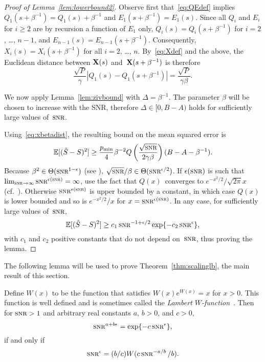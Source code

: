 \begin{proof}[Proof of Lemma~\ref{lem:lowerbound2}]
  Observe first that~\eqref{eq:QEdef} implies $Q_1(s + \beta^{-1}) = Q_1(s) +
  \beta^{-1}$ and $E_1(s + \beta^{-1}) = E_1(s)$. Since all $Q_i$ and $E_i$ for
  $i \ge 2$ are by recursion a function of $E_1$ only, $Q_i(s) = Q_i(s +
  \beta^{-1})$ for $i = 2$, \dots, $n-1$, and $E_{n-1}(s) = E_{n-1}(s +
  \beta^{-1})$. Consequently,  $X_i(s) = X_i(s + \beta^{-1})$ for all $i =
  2$, \dots, $n$. By~\eqref{eq:Xdef} and the above, the Euclidean distance
  between $\mathbf{X}(s)$ and~$\mathbf{X}(s+\beta^{-1})$ is therefore
  \begin{equation}
    \label{eq:xbetadist}
    \frac{\sqrt P}{\gamma} |Q_1(s) - Q_1(s+\beta^{-1})| 
    = \frac{\sqrt P}{\gamma\beta}.
  \end{equation}

  We now apply Lemma~\ref{lem:zivbound} with $\Delta = \beta^{-1}$. The
  parameter $\beta$ will be chosen to increase with the SNR, therefore $\Delta
  \in [0, B-A)$ holds for sufficiently large values of~$\snr$.

  Using~\eqref{eq:xbetadist}, the resulting bound on the mean squared error is
  \begin{equation*}
    \mse \ge \frac{\pmin}{4} \beta^{-2}
    Q\left (\frac{\sqrt{\snr}}{2\gamma\beta}  \right) (B-A-\beta^{-1}
    ).
  \end{equation*}
  Because $\beta^2 \in \Theta(\snr^{1-\e})$ (see ),
  $\sqrt{\snr}/\beta \in \Theta(\snr^{\e/2})$. If $\e(\snr)$ is such that
  $\limtoinf{\snr} \snr^{\e(\snr)} = \infty$, use the fact that $Q(x)$~converges
  to $e^{-x^2/2}/\sqrt{2\pi}x$ (cf.~\cite[.12]{AbramowitzS1964}).
  Otherwise $\snr^{\e(\snr)}$ is upper bounded by a constant, in which case
  $Q(x)$ is lower bounded and so is $e^{-x^2/2}/x$ for $x = \snr^{\e(\snr)}$.
  In any case, for sufficiently large values of~$\snr$,
  \begin{equation*}
    \mse \ge c_1 \snr^{-1 + \e/2} \exp\{-c_2\snr^\e\},
  \end{equation*}
  with $c_1$ and $c_2$ positive constants that do not depend on~$\snr$, thus
  proving the lemma.
\end{proof}

The following lemma will be used to prove Theorem~\ref{thm:scalinglb}, the main
result of this section.

\begin{lemma}
  \label{lem:epssolution}
  Define $W(x)$ to be the function that satisfies $W(x)e^{W(x)} = x$ for $x >
  0$.  This function is well defined and is sometimes called the \emph{Lambert
  $W$-function}~\textnormal{\cite{CorlessGHJK1996}}. Then for $\snr > 1$ and
  arbitrary real constants $a$, $b>0$, and $c > 0$, 
  \begin{equation}
    \label{eq:epsequation}
    \snr^{a+b\e} = \exp\{-c\snr^\e\},
  \end{equation}
  if and only if
  \begin{equation}
    \label{eq:epssolution}
    \snr^\e = (b/c) W(c\snr^{-a/b} / b).
  \end{equation}
\end{lemma}

